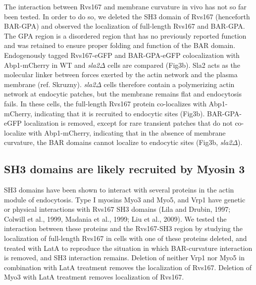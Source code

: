 \documentclass[9pt,lineno]{elife}
\begin{document}
The interaction between Rvs167 and membrane curvature in vivo has not so far been tested. In order to do so, we deleted the SH3 domain of Rvs167 (henceforth BAR-GPA) and observed the localization of full-length Rvs167 and BAR-GPA. The GPA region is a disordered region that has no previously reported function and was retained to ensure proper folding and function of the BAR domain. Endogenously tagged Rvs167-eGFP and BAR-GPA-eGFP colocalization with Abp1-mCherry in WT and \textit{sla2$\Delta$} cells are compared (Fig3b). Sla2 acts as the molecular linker between forces exerted by the actin network and the plasma membrane (ref. Skruzny). \textit{sla2$\Delta$} cells therefore contain a polymerizing actin network at endocytic patches, but the membrane remains flat and endocytosis fails. In these cells, the full-length Rvs167 protein co-localizes with Abp1-mCherry, indicating that it is recruited to endocytic sites (Fig3b). BAR-GPA-eGFP localization is removed, except for rare transient patches that do not co-localize with Abp1-mCherry, indicating that in the absence of membrane curvature, the BAR domains  cannot localize to endocytic sites (Fig3b, \textit{sla2$\Delta$}). 



\subsection{SH3 domains are likely recruited by Myosin 3}
SH3 domains have been shown to interact with several proteins in the actin module of endocytosis. Type I myosins Myo3 and Myo5, and Vrp1 have genetic or physical interactions with Rvs167 SH3 domains (Lila and Drubin, 1997; Colwill et al., 1999, Madania et al., 1999; Liu et al., 2009). 
We tested the interaction between these proteins and the Rvs167-SH3 region by studying the localization of full-length Rvs167 in cells with one of these proteins deleted, and treated with LatA to reproduce the situation in which BAR-curvature interaction is removed, and SH3 interaction remains. 
Deletion of neither Vrp1 nor Myo5 in combination with LatA treatment removes the localization of Rvs167. Deletion of Myo3 with LatA treatment removes localization of Rvs167. 
\end{document}
